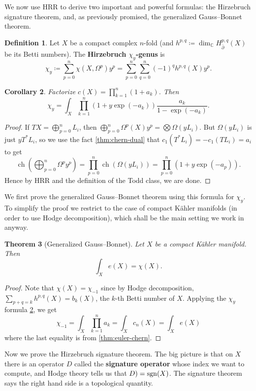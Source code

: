 \documentclass{report}
\theoremstyle{plain}
\newtheorem{theorem}{Theorem}[section]
\newtheorem{corollary}[theorem]{Corollary}
\theoremstyle{definition}
\newtheorem{definition}[theorem]{Definition}
\theoremstyle{remark}
\newcommand{\di}{\partial}
\newcommand{\bC}{\mathbb{C}}
\DeclareMathOperator{\ch}{ch}
\DeclareMathOperator{\sgn}{sgn}
\newcommand{\bdi}{\bar{\di}}
\begin{document}
We now use HRR to derive two important and powerful formulas: the
Hirzebruch signature theorem, and, as previously promised, the
generalized Gauss--Bonnet theorem.

\begin{definition}
  Let $X$ be a compact complex $n$-fold (and $h^{p,q} \coloneqq
  \dim_{\bC} H^{p,q}_{\bdi}(X)$ be its Betti numbers). The {\bf
    Hirzebruch $\chi_y$-genus} is
    \[ \chi_y \coloneqq \sum_{p=0}^n \chi(X, \Omega^p) y^p = \sum_{p=0}^n \sum_{q=0}^n (-1)^q h^{p,q}(X) y^p. \]
\end{definition}

\begin{corollary} \label{thm:chi-genus-formula}
  Factorize $c(X) = \prod_{k=1}^n (1 + a_k)$. Then
  \[ \chi_y = \int_X \prod_{k=1}^n (1 + y \exp(-a_k)) \frac{a_k}{1 - \exp(-a_k)}. \]
\end{corollary}

\begin{proof}
  If $TX = \bigoplus_{p=0}^n L_i$, then $\bigoplus_{p=0}^n
  \Omega^p(X)y^p = \bigotimes \Omega(yL_i)$. But $\Omega(yL_i)$ is
  just $yT^*L_i$, so we use the fact \ref{thm:chern-dual} that
  $c_1(T^*L_i) = -c_1(TL_i) = a_i$ to get
  \[ \ch\left(\bigoplus_{p=0}^n \Omega^p y^p\right) = \prod_{p=0}^n \ch(\Omega(yL_i)) = \prod_{p=0}^n (1 + y \exp(-a_p)). \]
  Hence by HRR and the definition of the Todd class, we are done.
\end{proof}

We first prove the generalized Gauss--Bonnet theorem using this
formula for $\chi_y$. To simplify the proof we restrict to the case of
compact K\"ahler manifolds (in order to use Hodge decomposition),
which shall be the main setting we work in anyway.

\begin{theorem}[Generalized Gauss--Bonnet] \label{thm:generalized-gauss-bonnet}
  Let $X$ be a compact K\"ahler manifold. Then
  \[ \int_X e(X) = \chi(X). \]
\end{theorem}

\begin{proof}
  Note that $\chi(X) = \chi_{-1}$ since by Hodge decomposition,
  $\sum_{p+q=k} h^{p,q}(X) = b_k(X)$, the $k$-th Betti number of $X$.
  Applying the $\chi_y$ formula \ref{thm:chi-genus-formula}, we get
  \[ \chi_{-1} = \int_X \prod_{k=1}^n a_k = \int_X c_n(X) = \int_X e(X) \]
  where the last equality is from \ref{thm:euler-chern}.
\end{proof}

Now we prove the Hirzebruch signature theorem. The big picture is that
on $X$ there is an operator $D$ called the {\bf signature operator}
whose index we want to compute, and Hodge theory tells us that
$\index(D) = \sgn(X)$. The signature theorem says the right hand side
is a topological quantity.
\end{document}
